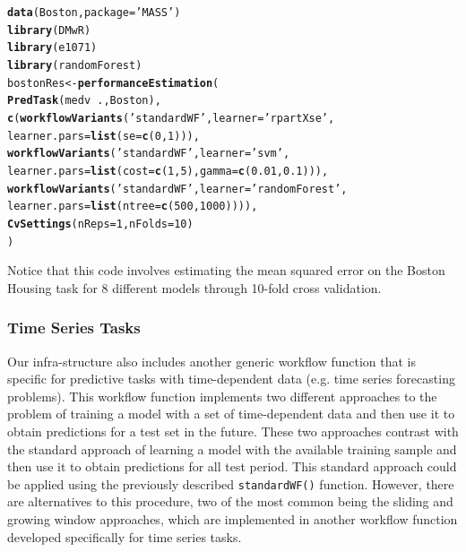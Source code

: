 \documentclass[10pt,a4paper]{article}\usepackage[]{graphicx}\usepackage[]{color}
\makeatletter
\newcommand{\hlnum}[1]{\textcolor[rgb]{0.686,0.059,0.569}{#1}}%
\newcommand{\hlstr}[1]{\textcolor[rgb]{0.192,0.494,0.8}{#1}}%
\newcommand{\hlopt}[1]{\textcolor[rgb]{0,0,0}{#1}}%
\newcommand{\hlstd}[1]{\textcolor[rgb]{0.345,0.345,0.345}{#1}}%
\newcommand{\hlkwb}[1]{\textcolor[rgb]{0.69,0.353,0.396}{#1}}%
\newcommand{\hlkwc}[1]{\textcolor[rgb]{0.333,0.667,0.333}{#1}}%
\newcommand{\hlkwd}[1]{\textcolor[rgb]{0.737,0.353,0.396}{\textbf{#1}}}%
\newenvironment{kframe}{%
 \def\at@end@of@kframe{}%
 \ifinner\ifhmode%
  \def\at@end@of@kframe{\end{minipage}}%
  \begin{minipage}{\columnwidth}%
 \fi\fi%
 \def\FrameCommand##1{\hskip\@totalleftmargin \hskip-\fboxsep
 \colorbox{shadecolor}{##1}\hskip-\fboxsep
     \hskip-\linewidth \hskip-\@totalleftmargin \hskip\columnwidth}%
 \MakeFramed {\advance\hsize-\width
   \@totalleftmargin\z@ \linewidth\hsize
   \@setminipage}}%
 {\par\unskip\endMakeFramed%
 \at@end@of@kframe}
\newenvironment{knitrout}{}{} %
\makeatother
\begin{document}
\begin{knitrout}\small
{}\color{fgcolor}\begin{kframe}
\begin{alltt}
\hlkwd{data}\hlstd{(Boston,}\hlkwc{package}\hlstd{=}\hlstr{'MASS'}\hlstd{)}
\hlkwd{library}\hlstd{(DMwR)}
\hlkwd{library}\hlstd{(e1071)}
\hlkwd{library}\hlstd{(randomForest)}
\hlstd{bostonRes} \hlkwb{<-} \hlkwd{performanceEstimation}\hlstd{(}
  \hlkwd{PredTask}\hlstd{(medv} \hlopt{~} \hlstd{.,Boston),}
  \hlkwd{c}\hlstd{(}\hlkwd{workflowVariants}\hlstd{(}\hlstr{'standardWF'}\hlstd{,}\hlkwc{learner}\hlstd{=}\hlstr{'rpartXse'}\hlstd{,}
                     \hlkwc{learner.pars}\hlstd{=}\hlkwd{list}\hlstd{(}\hlkwc{se}\hlstd{=}\hlkwd{c}\hlstd{(}\hlnum{0}\hlstd{,}\hlnum{1}\hlstd{))),}
    \hlkwd{workflowVariants}\hlstd{(}\hlstr{'standardWF'}\hlstd{,}\hlkwc{learner}\hlstd{=}\hlstr{'svm'}\hlstd{,}
                     \hlkwc{learner.pars}\hlstd{=}\hlkwd{list}\hlstd{(}\hlkwc{cost}\hlstd{=}\hlkwd{c}\hlstd{(}\hlnum{1}\hlstd{,}\hlnum{5}\hlstd{),}\hlkwc{gamma}\hlstd{=}\hlkwd{c}\hlstd{(}\hlnum{0.01}\hlstd{,}\hlnum{0.1}\hlstd{))),}
    \hlkwd{workflowVariants}\hlstd{(}\hlstr{'standardWF'}\hlstd{,}\hlkwc{learner}\hlstd{=}\hlstr{'randomForest'}\hlstd{,}
                     \hlkwc{learner.pars}\hlstd{=}\hlkwd{list}\hlstd{(}\hlkwc{ntree}\hlstd{=}\hlkwd{c}\hlstd{(}\hlnum{500}\hlstd{,}\hlnum{1000}\hlstd{)))),}
  \hlkwd{CvSettings}\hlstd{(}\hlkwc{nReps}\hlstd{=}\hlnum{1}\hlstd{,}\hlkwc{nFolds}\hlstd{=}\hlnum{10}\hlstd{)}
  \hlstd{)}
\end{alltt}
\end{kframe}
\end{knitrout}


Notice that this code involves estimating the mean squared error on the Boston Housing task for 8 different models through
10-fold cross validation. 


\subsubsection{Time Series Tasks}

Our infra-structure also includes another generic workflow function
that is specific for predictive tasks with time-dependent data
(e.g. time series forecasting problems). This workflow function
implements two different approaches to the problem of training a
 model with a set of time-dependent data and then use it to
obtain predictions for a test set in the future. These two approaches
contrast with the standard approach of learning a model with the
available training sample and then use it to obtain predictions for
all test period. This standard approach could be applied using the previously
described \texttt{standardWF()} function. However, there are
alternatives to this procedure, two of the most common being the
sliding and growing window approaches, which are implemented in another workflow function developed specifically for time series tasks.
\end{document}

